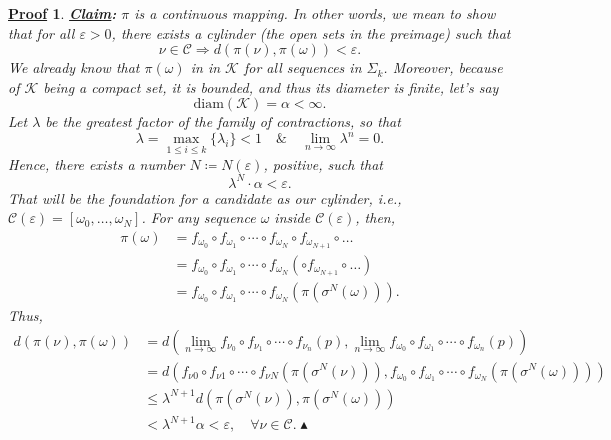 \documentclass{article}
\newtheorem*{proof*}{\underline{Proof}}
\begin{document}
\begin{proof*}
	\textbf{\underline{Claim}:} \(\pi \) is a continuous mapping. In other words, we mean to show that for all \(\varepsilon >0\), there exists a cylinder (the open sets in the preimage) such that
	\[
		\nu\in \mathcal{C} \Rightarrow d(\pi(\nu), \pi(\omega ))<\varepsilon .
	\]
	We already know that \(\pi (\omega )\) in in \(\mathcal{K}\) for all sequences in \(\Sigma_{k}\). Moreover, because of \(\mathcal{K}\) being a compact set, it is bounded, and thus its diameter is finite, let's say
	\[
		\mathrm{diam}(\mathcal{K})=\alpha < \infty.
	\]
	Let \(\lambda \) be the greatest factor of the family of contractions, so that
	\[
		\lambda =\max_{1\leq i\leq k}\{\lambda_{i}\} < 1 \quad\&\quad \lim_{n\to \infty}\lambda^{n}=0.
	\]
	Hence, there exists a number \(N\coloneqq N(\varepsilon )\), positive, such that
	\[
		\lambda^{N}\cdot \alpha < \varepsilon .
	\]
	That will be the foundation for a candidate as our cylinder, \textit{i.e.}, \(\mathcal{C}(\varepsilon ) = [\omega_{0}, \dotsc , \omega_{N}]\). For any sequence \(\omega \) inside \(\mathcal{C}(\varepsilon )\), then,
	\begin{align*}
		\pi (\omega ) & = f_{\omega_{0}}\circ f_{\omega_{1}}\circ\cdots\circ f_{\omega_{N}}\circ f_{\omega_{N+1}}\circ \dotsc   \\
		              & = f_{\omega_{0}}\circ f_{\omega_{1}}\circ\cdots\circ f_{\omega_{N}}(\circ f_{\omega_{N+1}}\circ \dotsc) \\
		              & = f_{\omega_{0}}\circ f_{\omega_{1}}\circ\cdots\circ f_{\omega_{N}}(\pi(\sigma^{N}(\omega ))).
	\end{align*}
	Thus,
	\begin{align*}
		d(\pi (\nu), \pi (\omega )) & = d(\lim_{n\to \infty}f_{\nu_{0}}\circ f_{\nu_{1}}\circ\cdots\circ f_{\nu_{n}}(p), \lim_{n\to \infty}f_{\omega_{0}}\circ f_{\omega_{1}}\circ\cdots\circ f_{\omega_{n}}(p))     \\
		                            & = d(f_{\nu{0}}\circ f_{\nu{1}}\circ\cdots\circ f_{\nu{N}}(\pi(\sigma^{N}(\nu ))), f_{\omega_{0}}\circ f_{\omega_{1}}\circ\cdots\circ f_{\omega_{N}}(\pi(\sigma^{N}(\omega )))) \\
		                            & \leq \lambda^{N+1}d(\pi(\sigma^{N}(\nu)), \pi(\sigma^{N}(\omega)))                                                                                                             \\
		                            & <\lambda ^{N+1}\alpha<\varepsilon ,\quad \forall \nu\in \mathcal{C}. \blacktriangle
	\end{align*}


\end{proof*}
\end{document}
